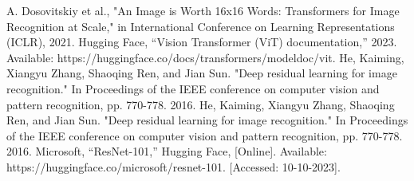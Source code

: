 \documentclass[conference]{IEEEtran}
\begin{document}
\begin{thebibliography}{00}
 A. Dosovitskiy et al., "An Image is Worth 16x16 Words: Transformers for Image Recognition at Scale," in International Conference on Learning Representations (ICLR), 2021.
 Hugging Face, ``Vision Transformer (ViT) documentation,'' 2023. Available: https://huggingface.co/docs/transformers/model\textunderscore doc/vit. 
 He, Kaiming, Xiangyu Zhang, Shaoqing Ren, and Jian Sun. "Deep residual learning for image recognition." In Proceedings of the IEEE conference on computer vision and pattern recognition, pp. 770-778. 2016.
 He, Kaiming, Xiangyu Zhang, Shaoqing Ren, and Jian Sun. "Deep residual learning for image recognition." In Proceedings of the IEEE conference on computer vision and pattern recognition, pp. 770-778. 2016.
 Microsoft, “ResNet-101,” Hugging Face, [Online]. Available: https://huggingface.co/microsoft/resnet-101. [Accessed: 10-10-2023].
\end{thebibliography}
\vspace{12pt}
\end{document}
